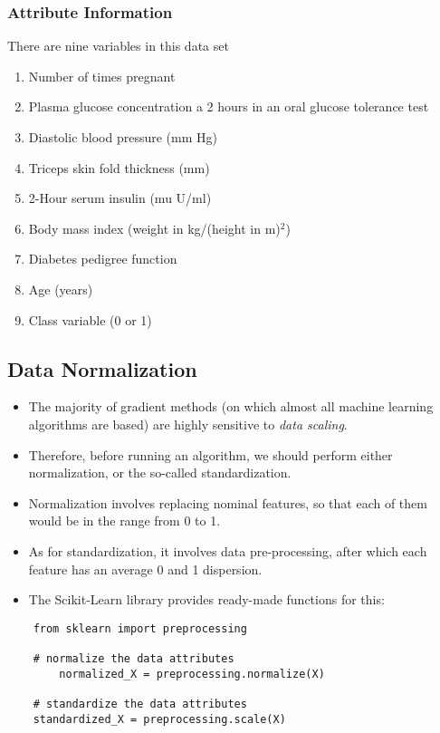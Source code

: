 \documentclass[a4paper,12pt]{article}
\begin{document}
\subsubsection*{Attribute Information}
There are nine variables in this data set
\begin{enumerate}

	
	\item 	 Number of times pregnant 
	\item 	 Plasma glucose concentration a 2 hours in an oral glucose tolerance test 
	\item 	 Diastolic blood pressure (mm Hg) 
	\item 	 Triceps skin fold thickness (mm) 
	\item 	 2-Hour serum insulin (mu U/ml) 
	\item 	 Body mass index (weight in kg/(height in m)$^2$) 
	\item 	 Diabetes pedigree function 
	\item 	 Age (years) 
	\item 	 Class variable (0 or 1)
	
\end{enumerate}
\newpage
\subsection{Data Normalization}
\begin{itemize}
\item The majority of gradient methods (on which almost all machine learning algorithms are based) are highly sensitive to \textit{data scaling}.
\item Therefore, before running an algorithm, we should perform either normalization, or the so-called standardization. 
\item Normalization involves replacing nominal features, so that each of them would be in the range from 0 to 1.
\item  As for standardization, it involves data pre-processing, after which each feature has an average 0 and 1 dispersion. 
\item The Scikit-Learn library provides ready-made functions for this:
\end{itemize}


\begin{framed}
	\begin{verbatim}
	from sklearn import preprocessing
	
	# normalize the data attributes
		normalized_X = preprocessing.normalize(X)
	
	# standardize the data attributes
	standardized_X = preprocessing.scale(X)
	\end{verbatim}
\end{framed}
\end{document}
